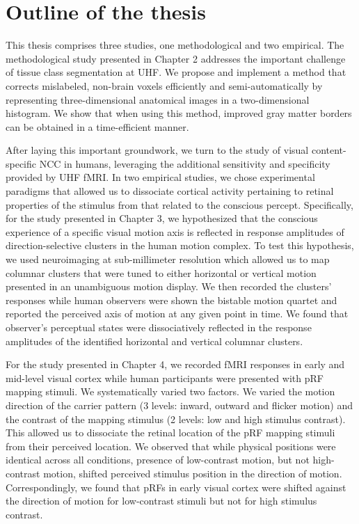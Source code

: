 \section{Outline of the thesis}
This thesis comprises three studies, one methodological and two empirical. The methodological study presented in Chapter 2 addresses the important challenge of tissue class segmentation at UHF. We propose and implement a method that corrects mislabeled, non-brain voxels efficiently and semi-automatically by representing three-dimensional anatomical images in a two-dimensional histogram. We show that when using this method, improved gray matter borders can be obtained in a time-efficient manner.

After laying this important groundwork, we turn to the study of visual content-specific NCC in humans, leveraging the additional sensitivity and specificity provided by UHF fMRI. In two empirical studies, we chose experimental paradigms that allowed us to dissociate cortical activity pertaining to retinal properties of the stimulus from that related to the conscious percept. Specifically, for the study presented in Chapter 3, we hypothesized that the conscious experience of a specific visual motion axis is reflected in response amplitudes of direction-selective clusters in the human motion complex. To test this hypothesis, we used neuroimaging at sub-millimeter resolution which allowed us to map columnar clusters that were tuned to either horizontal or vertical motion presented in an unambiguous motion display. We then recorded the clusters' responses while human observers were shown the bistable motion quartet and reported the perceived axis of motion at any given point in time. We found that observer's perceptual states were dissociatively reflected in the response amplitudes of the identified horizontal and vertical columnar clusters.

For the study presented in Chapter 4, we recorded fMRI responses in early and mid-level visual cortex while human participants were presented with pRF mapping stimuli. We systematically varied two factors. We varied the motion direction of the carrier pattern (3 levels: inward, outward and flicker motion) and the contrast of the mapping stimulus (2 levels: low and high stimulus contrast). This allowed us to dissociate the retinal location of the pRF mapping stimuli from their perceived location. We observed that while physical positions were identical across all conditions, presence of low-contrast motion, but not high-contrast motion, shifted perceived stimulus position in the direction of motion. Correspondingly, we found that pRFs in early visual cortex were shifted against the direction of motion for low-contrast stimuli but not for high stimulus contrast.

\clearpage
\printbibliography[heading=subbibnumbered, title={References}]